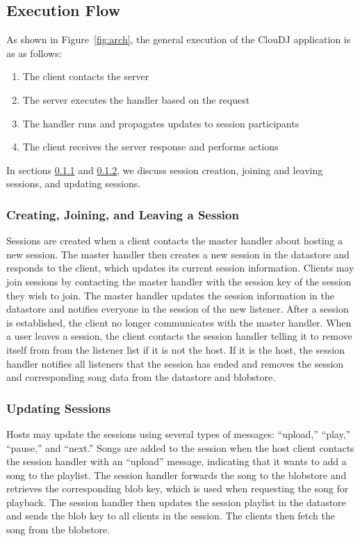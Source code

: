 \subsection{Execution Flow}
\label{sec:execution}
As shown in Figure~\ref{fig:arch}, the general execution of the ClouDJ application
is as as follows:
\begin{enumerate}
  \item The client contacts the server
  \item The server executes the handler based on the request
  \item The handler runs and propagates updates to session participants
  \item The client receives the server response and performs actions 
\end{enumerate}

In sections \ref{sec:joinSession} and \ref{sec:playSession}, we discuss
session creation, joining and leaving sessions, and updating sessions.


\subsubsection{Creating, Joining, and Leaving a Session}
\label{sec:joinSession}
Sessions are created when a client contacts the master 
handler about hosting a new session. The master handler 
then creates a new session in the datastore and responds to the client, 
which updates its current session information. 
Clients may join sessions by contacting the master 
handler with the session key of the session they wish to join. 
The master handler updates the session information in the datastore
and notifies everyone in the session of the new listener. 
After a session is established, the client no longer communicates 
with the master handler. When a user leaves a session, the client
contacts the session handler telling it to remove itself from from
the listener list if it is not the host. If it is the host, the
session handler notifies all listeners that the session has ended and 
removes the session and corresponding song data from the datastore
and blobstore.

\subsubsection{Updating Sessions}
\label{sec:playSession}
Hosts may update the sessions using several types of messages: ``upload,''
``play,'' ``pause,'' and ``next.'' Songs are added to the session when 
the host client contacts the session handler with an ``upload'' message, 
indicating that it wants to add a song to the playlist. The session 
handler forwards the song to the blobstore and retrieves the corresponding 
blob key, which is used when requesting the song for playback. The session
handler then updates the session playlist in the datastore and sends the 
blob key to all clients in the session. The clients then fetch the song 
from the blobstore. 

